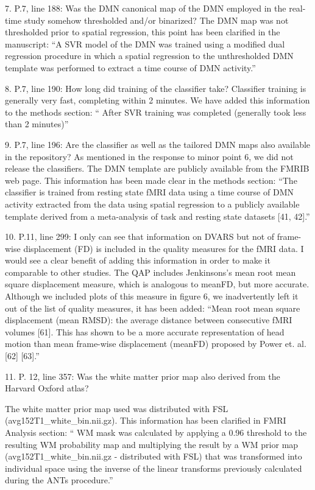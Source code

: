 \documentclass{article}
\newcommand{\RESPONSE}[1]{\textcolor{responseblue}{#1}}
\begin{document}
7. P.7, line 188: Was the DMN canonical map of the DMN employed in the real-time study somehow thresholded and/or binarized?
\RESPONSE{The DMN map was not thresholded prior to spatial regression, this point has been clarified in the manuscript: ``A SVR model of the DMN was trained using a modified dual regression procedure in which a spatial regression to the unthresholded DMN template was performed to extract a time course of DMN activity.''}

8. P.7, line 190: How long did training of the classifier take?
\RESPONSE{Classifier training is generally very fast, completing within 2 minutes. We have added this information to the methods section: `` After SVR training was completed (generally took less than 2 minutes)''}

9. P.7, line 196: Are the classifier as well as the tailored DMN maps also available in the repository?
\RESPONSE{As mentioned in the response to minor point 6, we did not release the classifiers. The DMN template are publicly available from the FMRIB web page. This information has been made clear in the methods section: ``The classifier is trained from resting state fMRI data using a time course of DMN activity extracted from the data using spatial regression to a publicly available template derived from a meta-analysis of task and resting state datasets [41, 42].''}

10. P.11, line 299: I only can see that information on DVARS but not of frame-wise displacement (FD) is included in the quality measures for the fMRI data. I would see a clear benefit of adding this information in order to make it comparable to other studies. \RESPONSE{The QAP includes Jenkinsons's mean root mean square displacement measure, which is analogous to meanFD, but more accurate. Although we included plots of this measure in figure 6, we inadvertently left it out of the list of quality measures, it has been added: ``Mean  root  mean  square  displacement  (mean  RMSD): the average distance between consecutive fMRI volumes  [61].   This  has  shown  to  be  a  more  accurate  representation  of  head  motion  than mean frame-wise displacement (meanFD) proposed by Power et.  al.  [62] [63].''}


11. P. 12, line 357: Was the white matter prior map also derived from the Harvard Oxford atlas?

\RESPONSE{The white matter prior map used was distributed with FSL (avg152T1\_white\_bin.nii.gz). This information has been clarified in FMRI Analysis section: `` WM mask was calculated by applying a 0.96 threshold to the resulting WM probability map and multiplying the result by a WM prior map (avg152T1\_white\_bin.nii.gz - distributed with FSL) that was transformed into individual space using the inverse of the linear transforms previously calculated during the ANTs procedure.''}
\end{document}

